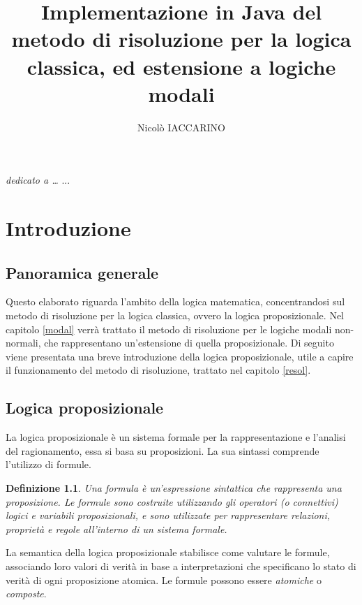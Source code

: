 \documentclass[a4paper,12pt]{report}
\newtheorem{definition}{Definizione}[section]
\begin{document}
\title{Implementazione in Java del metodo di risoluzione per la logica classica, ed estensione a logiche modali}
\author{Nicolò IACCARINO}
% 
%
\beforepreface
{}
        {\hfill \Large {\sl dedicato a \dots}}
% 
%
...

%
%

\afterpreface
\pagestyle{mystyle} %
% 
% 
\chapter{Introduzione}
\label{intro}

\section{Panoramica generale}
Questo elaborato riguarda l'ambito della logica matematica, concentrandosi sul metodo di risoluzione per la logica classica, ovvero la logica proposizionale. Nel capitolo \ref{modal} verrà trattato il metodo di risoluzione per le logiche modali non-normali, che rappresentano un'estensione di quella proposizionale. Di seguito viene presentata una breve introduzione della logica proposizionale, utile a capire il funzionamento del metodo di risoluzione, trattato nel capitolo \ref{resol}.

\section{Logica proposizionale}
La logica proposizionale è un sistema formale per la rappresentazione e l'analisi del ragionamento, essa si basa su proposizioni. La sua sintassi comprende l'utilizzo di formule.

\begin{definition}
    Una formula è un'espressione sintattica che rappresenta una proposizione. Le formule sono costruite utilizzando gli operatori (o connettivi) logici e variabili proposizionali, e sono utilizzate per rappresentare relazioni, proprietà e regole all'interno di un sistema formale.
\end{definition}
La semantica della logica proposizionale stabilisce come valutare le formule, associando loro valori di verità in base a interpretazioni che specificano lo stato di verità di ogni proposizione atomica. Le formule possono essere \emph{atomiche} o \emph{composte}.
\end{document}
